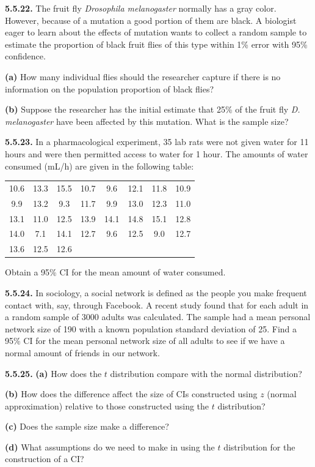 \textbf{5.5.22.} The fruit fly \textit{Drosophila melanogaster} normally has a gray color. However, because of a mutation a good portion of them are black. A biologist eager to learn about the effects of mutation wants to collect a random sample to estimate the proportion of black fruit flies of this type within 1\% error with 95\% confidence.

\textbf{(a)} How many individual flies should the researcher capture if there is no information on the population proportion of black flies?

\textbf{(b)} Suppose the researcher has the initial estimate that 25\% of the fruit fly \textit{D. melanogaster} have been affected by this mutation. What is the sample size?

\textbf{5.5.23.} In a pharmacological experiment, 35 lab rats were not given water for 11 hours and were then permitted access to water for 1 hour. The amounts of water consumed (mL/h) are given in the following table:

\begin{center}
\begin{tabular}{cccccccc}
10.6 & 13.3 & 15.5 & 10.7 & 9.6 & 12.1 & 11.8 & 10.9 \\
9.9 & 13.2 & 9.3 & 11.7 & 9.9 & 13.0 & 12.3 & 11.0 \\
13.1 & 11.0 & 12.5 & 13.9 & 14.1 & 14.8 & 15.1 & 12.8 \\
14.0 & 7.1 & 14.1 & 12.7 & 9.6 & 12.5 & 9.0 & 12.7 \\
13.6 & 12.5 & 12.6 & & & & & \\
\end{tabular}
\end{center}

Obtain a 95\% CI for the mean amount of water consumed.

\textbf{5.5.24.} In sociology, a social network is defined as the people you make frequent contact with, say, through Facebook. A recent study found that for each adult in a random sample of 3000 adults was calculated. The sample had a mean personal network size of 190 with a known population standard deviation of 25. Find a 95\% CI for the mean personal network size of all adults to see if we have a normal amount of friends in our network.

\textbf{5.5.25.} \quad \textbf{(a)} How does the $t$ distribution compare with the normal distribution?

\textbf{(b)} How does the difference affect the size of CIs constructed using $z$ (normal approximation) relative to those constructed using the $t$ distribution?

\textbf{(c)} Does the sample size make a difference?

\textbf{(d)} What assumptions do we need to make in using the $t$ distribution for the construction of a CI?
